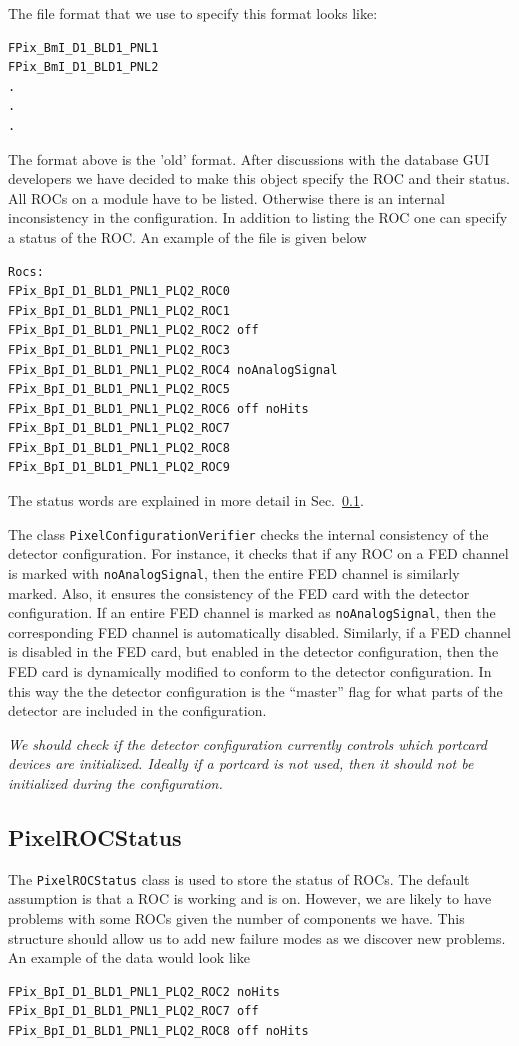 The file format that we use to specify this format looks like:
\begin{verbatim}
FPix_BmI_D1_BLD1_PNL1
FPix_BmI_D1_BLD1_PNL2
.
.
.
\end{verbatim}

The format above is the 'old' format. After discussions with the
database GUI developers we have decided to make this object
specify the ROC and their status. All ROCs on a module have
to be listed. Otherwise there is an internal inconsistency in
the configuration. In addition to listing the ROC one can
specify a status of the ROC. An example of the file is
given below
\begin{verbatim}
Rocs:
FPix_BpI_D1_BLD1_PNL1_PLQ2_ROC0 
FPix_BpI_D1_BLD1_PNL1_PLQ2_ROC1 
FPix_BpI_D1_BLD1_PNL1_PLQ2_ROC2 off
FPix_BpI_D1_BLD1_PNL1_PLQ2_ROC3 
FPix_BpI_D1_BLD1_PNL1_PLQ2_ROC4 noAnalogSignal
FPix_BpI_D1_BLD1_PNL1_PLQ2_ROC5 
FPix_BpI_D1_BLD1_PNL1_PLQ2_ROC6 off noHits
FPix_BpI_D1_BLD1_PNL1_PLQ2_ROC7 
FPix_BpI_D1_BLD1_PNL1_PLQ2_ROC8 
FPix_BpI_D1_BLD1_PNL1_PLQ2_ROC9 
\end{verbatim}
The status words are explained in more detail in Sec.~\ref{sec:rocstatus}.

The class {\tt PixelConfigurationVerifier} checks the internal
consistency of the detector configuration. For instance, it checks
that if any ROC on a FED channel is marked with {\tt noAnalogSignal},
then the entire FED channel is similarly marked. Also, it ensures the
consistency of the FED card with the detector configuration. If an
entire FED channel is marked as {\tt noAnalogSignal}, then the
corresponding FED channel is automatically disabled. Similarly, if a
FED channel is disabled in the FED card, but enabled in the detector
configuration, then the FED card is dynamically modified to conform to
the detector configuration. In this way the the detector configuration
is the ``master'' flag for what parts of the detector are included in
the configuration.

{\em We should check if the detector configuration currently controls
which portcard devices are initialized. Ideally if a portcard is not
used, then it should not be initialized during the configuration.}


\subsection{PixelROCStatus}
\label{sec:rocstatus}
The {\tt PixelROCStatus} class is used to store the status
of ROCs. The default assumption is that a ROC is working and
is on. However, we are likely to have problems with some ROCs
given the number of components we have. This structure should
allow us to add new failure modes as we discover new 
problems. An example of the data would look like
\begin{verbatim}
FPix_BpI_D1_BLD1_PNL1_PLQ2_ROC2 noHits
FPix_BpI_D1_BLD1_PNL1_PLQ2_ROC7 off
FPix_BpI_D1_BLD1_PNL1_PLQ2_ROC8 off noHits
\end{verbatim}

